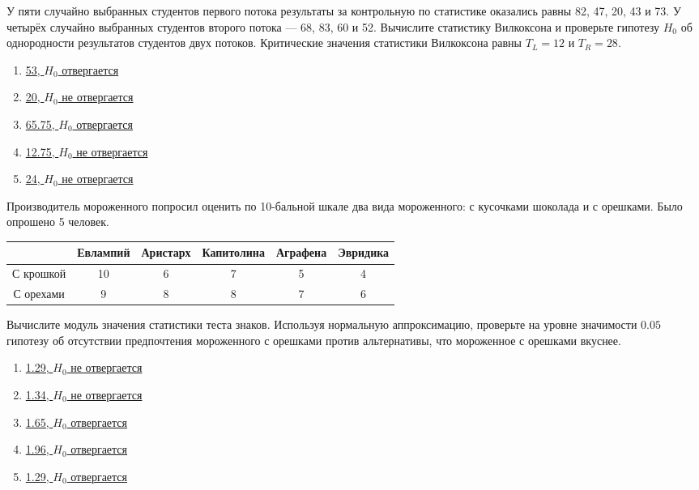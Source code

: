 \documentclass[t]{beamer}
\begin{document}
 \begin{frame} \label{61} 
\begin{block}{61} 

У пяти случайно выбранных студентов первого потока результаты за контрольную по статистике оказались равны  82, 47, 20, 43 и 73. У четырёх случайно выбранных студентов второго потока — 68, 83, 60 и 52. Вычислите статистику Вилкоксона и проверьте гипотезу $H_0$ об однородности результатов студентов двух потоков. Критические значения статистики Вилкоксона равны $T_L=12$ и $T_R=28$.
 


 \end{block} 
\begin{enumerate} 
\item[] \hyperlink{61-No}{\beamergotobutton{} 53, $H_0$ отвергается}
\item[] \hyperlink{61-No}{\beamergotobutton{} 20, $H_0$ не отвергается}
\item[] \hyperlink{61-No}{\beamergotobutton{} 65.75, $H_0$ отвергается}
\item[] \hyperlink{61-No}{\beamergotobutton{} 12.75, $H_0$ не отвергается}
\item[] \hyperlink{61-Yes}{\beamergotobutton{} 24, $H_0$ не отвергается}
\end{enumerate} 
\end{frame} 


 \begin{frame} \label{62} 
\begin{block}{62} 

 Производитель мороженного попросил оценить по 10-бальной шкале два вида мороженного: с кусочками шоколада и с орешками. Было опрошено 5 человек.


 \begin{tabular}{c|ccccc}
  & Евлампий & Аристарх & Капитолина & Аграфена & Эвридика \\
 \hline
С крошкой & 10 & 6 & 7 & 5 & 4 \\
С орехами & 9 & 8 & 8 & 7 & 6 \\
 \end{tabular}


Вычислите модуль значения статистики теста знаков. Используя нормальную аппроксимацию, проверьте на уровне значимости $0.05$ гипотезу об отсутствии предпочтения мороженного с орешками против альтернативы, что мороженное с орешками вкуснее.
 


 \end{block} 
\begin{enumerate} 
\item[] \hyperlink{62-No}{\beamergotobutton{} 1.29, $H_0$ не отвергается}
\item[] \hyperlink{62-No}{\beamergotobutton{} 1.34, $H_0$ не отвергается}
\item[] \hyperlink{62-No}{\beamergotobutton{} 1.65, $H_0$ отвергается}
\item[] \hyperlink{62-Yes}{\beamergotobutton{} 1.96, $H_0$ отвергается}
\item[] \hyperlink{62-No}{\beamergotobutton{} 1.29, $H_0$ отвергается}
\end{enumerate} 
\end{frame} 
\end{document}
